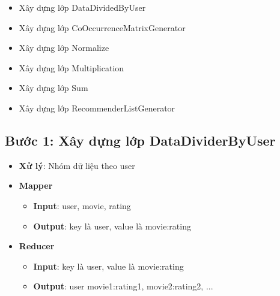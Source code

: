 \documentclass{report}
\begin{document}
\begin{itemize}
          \begin{itemize}
              \item Xây dựng lớp DataDividedByUser
              \item Xây dựng lớp CoOccurrenceMatrixGenerator
              \item Xây dựng lớp Normalize
              \item Xây dựng lớp Multiplication
              \item Xây dựng lớp Sum
              \item Xây dựng lớp RecommenderListGenerator
          \end{itemize}
\end{itemize}

\subsection*{Bước 1: Xây dựng lớp DataDividerByUser}
\begin{itemize}
    \item \textbf{Xử lý}: Nhóm dữ liệu theo user \\
    \item \textbf{Mapper}
          \begin{itemize}
              \item \textbf{Input}: user, movie, rating \\
              \item \textbf{Output}: key là user, value là movie:rating \\
          \end{itemize}
    \item \textbf{Reducer}
          \begin{itemize}
              \item \textbf{Input}: key là user, value là movie:rating \\
              \item \textbf{Output}: user \quad movie1:rating1, movie2:rating2, ... \\
          \end{itemize}
\end{itemize}
\end{document}
